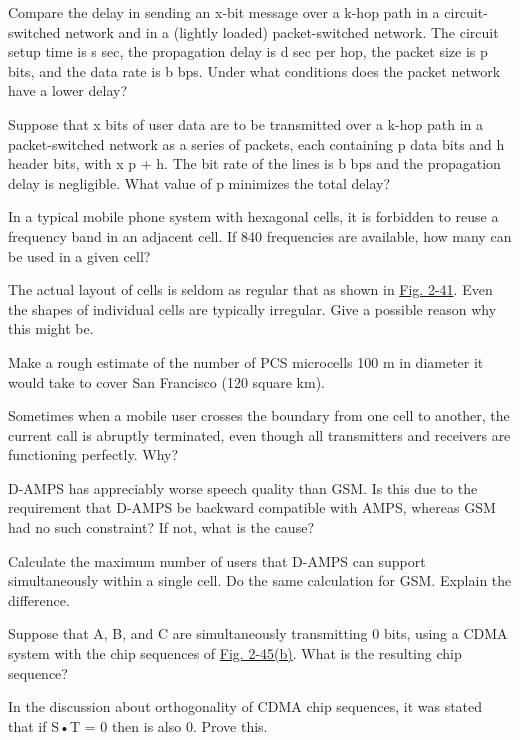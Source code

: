 Compare the delay in sending an {x}-bit message over a {k}-hop path in a
circuit-switched network and in a (lightly loaded) packet-switched
network. The circuit setup time is {s} sec, the propagation delay is {d}
sec per hop, the packet size is {p} bits, and the data rate is {b} bps.
Under what conditions does the packet network have a lower delay?

Suppose that {x} bits of user data are to be transmitted over a {k}-hop
path in a packet-switched network as a series of packets, each
containing {p} data bits and {h} header bits, with {x}
 {p} + {h.} The bit rate of the lines is {b}
bps and the propagation delay is negligible. What value of {p} minimizes
the total delay?

In a typical mobile phone system with hexagonal cells, it is forbidden
to reuse a frequency band in an adjacent cell. If 840 frequencies are
available, how many can be used in a given cell?

The actual layout of cells is seldom as regular that as shown in
\protect\hyperlink{0130661023_ch02lev1sec6.htmlux5cux23ch02fig41}{Fig.
2-41}. Even the shapes of individual cells are typically irregular. Give
a possible reason why this might be.

Make a rough estimate of the number of PCS microcells 100 m in diameter
it would take to cover San Francisco (120 square km).

Sometimes when a mobile user crosses the boundary from one cell to
another, the current call is abruptly terminated, even though all
transmitters and receivers are functioning perfectly. Why?

D-AMPS has appreciably worse speech quality than GSM. Is this due to the
requirement that D-AMPS be backward compatible with AMPS, whereas GSM
had no such constraint? If not, what is the cause?

Calculate the maximum number of users that D-AMPS can support
simultaneously within a single cell. Do the same calculation for GSM.
Explain the difference.

Suppose that {A}, {B}, and {C} are simultaneously transmitting 0 bits,
using a CDMA system with the chip sequences of
\protect\hyperlink{0130661023_ch02lev1sec6.htmlux5cux23ch02fig45}{Fig.
2-45(b)}. What is the resulting chip sequence?

In the discussion about orthogonality of CDMA chip sequences, it was
stated that if {S}•{T} = 0 then
 is also
0. Prove this.

